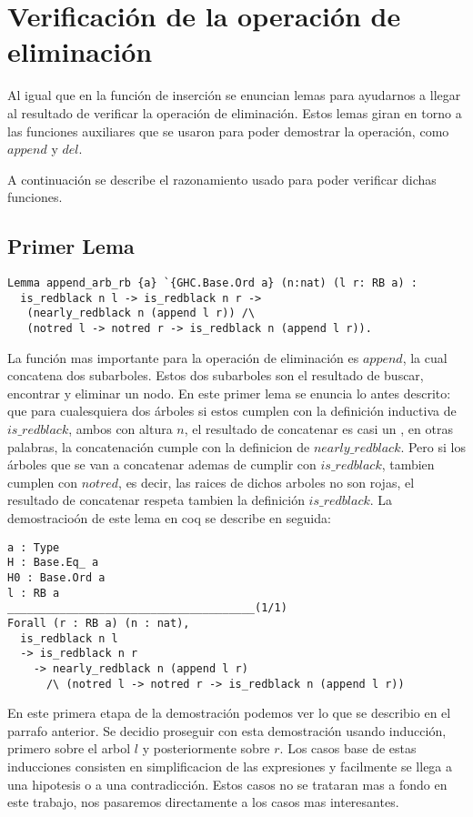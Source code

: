 \section{Verificación de la operación de eliminación}
Al igual que en la funci\'on de inserci\'on se enuncian lemas para ayudarnos a llegar al resultado
de verificar la operación de eliminación. Estos lemas giran en torno a las funciones auxiliares
que se usaron para poder demostrar la operación, como $append$ y $del$.

A continuación se describe el razonamiento usado para poder verificar dichas funciones.

\subsection{Primer Lema}
\begin{verbatim}
Lemma append_arb_rb {a} `{GHC.Base.Ord a} (n:nat) (l r: RB a) :
  is_redblack n l -> is_redblack n r ->
   (nearly_redblack n (append l r)) /\
   (notred l -> notred r -> is_redblack n (append l r)).
\end{verbatim}

La funci\'on mas importante para la operaci\'on de eliminaci\'on es $append$, la cual concatena
dos subarboles. Estos dos subarboles son el resultado de buscar, encontrar y eliminar un nodo. En
este primer lema se enuncia lo antes descrito: que para cualesquiera dos \'arboles si estos
cumplen con la definici\'on inductiva de $is\_redblack$, ambos con altura $n$, el resultado de
concatenar es casi un {\arn}, en otras palabras, la concatenaci\'on cumple con la definicion de
$nearly\_redblack$. Pero si los \'arboles que se van a concatenar ademas de cumplir con
$is\_redblack$, tambien cumplen con $notred$, es decir, las raices de dichos arboles no son rojas,
el resultado de concatenar respeta tambien la definici\'on $is\_redblack$. La demostracio\'on de
este lema en coq se describe en seguida:
\begin{verbatim}
a : Type
H : Base.Eq_ a
H0 : Base.Ord a
l : RB a
______________________________________(1/1)
Forall (r : RB a) (n : nat),
  is_redblack n l
  -> is_redblack n r
    -> nearly_redblack n (append l r)
      /\ (notred l -> notred r -> is_redblack n (append l r))
\end{verbatim}

En este primera etapa de la demostraci\'on podemos ver lo que se describio en el parrafo anterior.
Se decidio proseguir con esta demostraci\'on usando inducci\'on, primero sobre el arbol $l$ y
posteriormente sobre $r$. Los casos base de estas inducciones consisten en simplificacion de las
expresiones y facilmente se llega a una hipotesis o a una contradicci\'on. Estos casos no se
trataran mas a fondo en este trabajo, nos pasaremos directamente a los casos mas interesantes.

